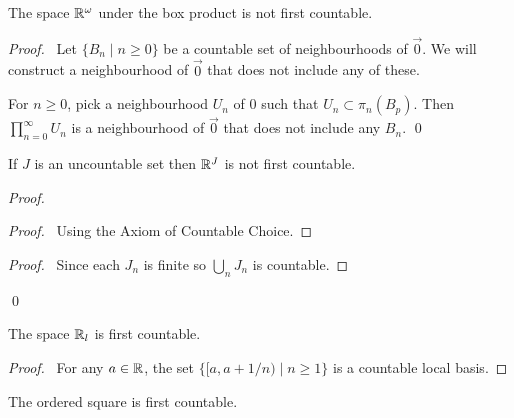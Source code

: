 \begin{example}[CC]
    The space $\mathbb{R}^\omega$ under the box product is not first countable.
\end{example}

\begin{proof}
    \pf\ Let $\{ B_n \mid n \geq 0 \}$ be a countable set of neighbourhoods of $\vec{0}$. We will construct a neighbourhood of $\vec{0}$ that does not include any of these.

    For $n \geq 0$, pick a neighbourhood $U_n$ of 0 such that $U_n \subset \pi_n(B_p)$. Then $\prod_{n=0}^\infty U_n$ is a neighbourhood of $\vec{0}$ that does not
    include any $B_n$. \qed
\end{proof}

\begin{example}
    If $J$ is an uncountable set then $\mathbb{R}^J$ is not first countable.
\end{example}

\begin{proof}
    \pf
    \begin{proof}
        \pf\ Using the Axiom of Countable Choice.
    \end{proof}
    \begin{proof}
        \pf\ Since each $J_n$ is finite so $\bigcup_n J_n$ is countable.
    \end{proof}
    \qed
\end{proof}

\begin{example}
    The space $\mathbb{R}_l$ is first countable.
\end{example}

\begin{proof}
    \pf\ For any $a \in \mathbb{R}$, the set $\{ [a,a + 1/n) \mid n \geq 1 \}$ is a countable local basis.
\end{proof}

\begin{example}
    The ordered square is first countable.
\end{example}

